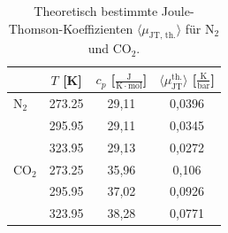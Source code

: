 \documentclass[a4paper,12pt,oneside,onecolum,final,openany]{report}
\begin{document}
\begin{table} [h]
\centering
\caption{Theoretisch bestimmte Joule-Thomson-Koeffizienten $\langle \mu_{\text{JT, th.}} \rangle$ für $\text{N}_2$  und $\mathrm{CO}_2$.}
\begin{tabular} {l | c|  c | c}
	 &  $T$ [K] &  $c_p$ [$\frac{\mathrm{J}}{\mathrm{K}\cdot \mathrm{mol}}$] & $ \langle\mu_{\text{JT}}^{\text{th.}}\rangle$ [$\frac{\mathrm{K}}{\mathrm{bar}}$] \\
	 \hline
	  $\text{N}_\mathrm{2}$ & 273.25 & 29,11 & 0,0396\\
	   & 295.95 & 29,11 & 0,0345\\
	  & 323.95 & 29,13 & 0,0272 \\
	\hline
	$\mathrm{CO}_2$ & 273.25& 35,96&0,106  \\
	& 295.95 & 37,02& 0,0926\\
	& 323.95& 38,28& 0,0771\\
\end{tabular}
\end{table}
\FloatBarrier


\end{document}
